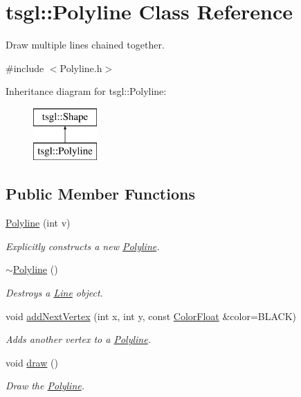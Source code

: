 \hypertarget{classtsgl_1_1_polyline}{}\section{tsgl\+:\+:Polyline Class Reference}
\label{classtsgl_1_1_polyline}


Draw multiple lines chained together.  




{\ttfamily \#include $<$Polyline.\+h$>$}

Inheritance diagram for tsgl\+:\+:Polyline\+:\begin{figure}[H]
\begin{center}
\leavevmode
\includegraphics[height=2.000000cm]{classtsgl_1_1_polyline}
\end{center}
\end{figure}
\subsection*{Public Member Functions}
\begin{DoxyCompactItemize}
\item 
\hyperlink{classtsgl_1_1_polyline_adc501ce6f5d7e653d21211cf469379cc}{Polyline} (int v)
\begin{DoxyCompactList}\small\item\em Explicitly constructs a new \hyperlink{classtsgl_1_1_polyline}{Polyline}. \end{DoxyCompactList}\item 
\hyperlink{classtsgl_1_1_polyline_a5e186f8a65dae833d123480552b0eaad}{$\sim$\+Polyline} ()
\begin{DoxyCompactList}\small\item\em Destroys a \hyperlink{classtsgl_1_1_line}{Line} object. \end{DoxyCompactList}\item 
void \hyperlink{classtsgl_1_1_polyline_ab6598c7f60e57d9b988b19e90123da53}{add\+Next\+Vertex} (int x, int y, const \hyperlink{structtsgl_1_1_color_float}{Color\+Float} \&color=B\+L\+A\+C\+K)
\begin{DoxyCompactList}\small\item\em Adds another vertex to a \hyperlink{classtsgl_1_1_polyline}{Polyline}. \end{DoxyCompactList}\item 
void \hyperlink{classtsgl_1_1_polyline_ac6de5e2817824d9427d02d3e7be37f47}{draw} ()
\begin{DoxyCompactList}\small\item\em Draw the \hyperlink{classtsgl_1_1_polyline}{Polyline}. \end{DoxyCompactList}\end{DoxyCompactItemize}
